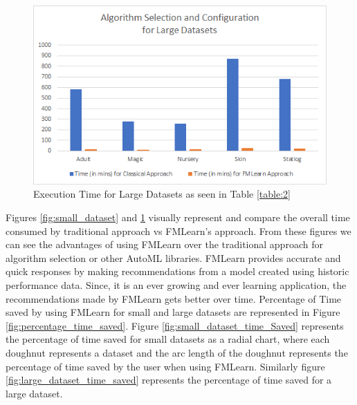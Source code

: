 \begin{figure}[H]
    \centering
    \includegraphics[width=15cm]{images/Large Datasets.png}
    \caption{Execution Time for Large Datasets as seen in Table \ref{table:2}}
    \label{fig:large_dataset}
\end{figure}

\newpage

Figures \ref{fig:small_dataset} and \ref{fig:large_dataset} visually represent and compare the overall time consumed by traditional approach vs FMLearn's approach. From these figures we can see the advantages of using FMLearn over the traditional approach for algorithm selection or other AutoML libraries. FMLearn provides accurate and quick responses by making recommendations from a model created using historic performance data. Since, it is an ever growing and ever learning application, the recommendations made by FMLearn gets better over time. Percentage of Time saved by using FMLearn for small and large datasets are represented in Figure \ref{fig:percentage_time_saved}. Figure \ref{fig:small_dataset_time_Saved} represents the percentage of time saved for small datasets as a radial chart, where each doughnut represents a dataset and the arc length of the doughnut represents the percentage of time saved by the user when using FMLearn. Similarly figure \ref{fig:large_dataset_time_saved} represents the percentage of time saved for a large dataset.

